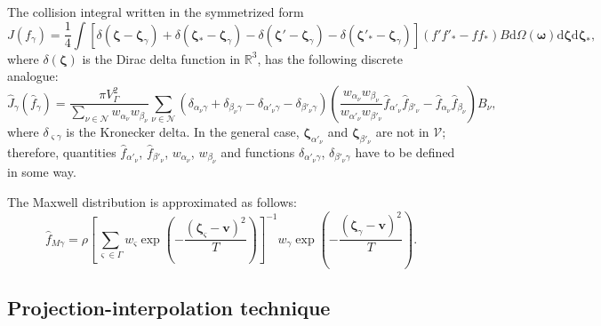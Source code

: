 \documentclass[10pt]{article}
\newcommand{\dd}{\mathrm{d}}
\newcommand{\dzeta}{\boldsymbol{\dd\zeta}}
\newcommand{\bzeta}{\boldsymbol{\zeta}}
\newcommand{\Nu}{\mathcal{N}}
\begin{document}
The collision integral written in the symmetrized form
\begin{equation}\label{eq:symm_ci}
    J(f_\gamma) = \frac14\int \left[
        \delta(\bzeta-\bzeta_\gamma) + \delta(\bzeta_*-\bzeta_\gamma)
        - \delta(\bzeta'-\bzeta_\gamma) - \delta(\bzeta'_*-\bzeta_\gamma)\right]
        (f'f'_* - ff_*)B \dd\Omega(\boldsymbol{\omega}) \dzeta\dzeta_*,
\end{equation}
where \(\delta(\bzeta)\) is the Dirac delta function in \(\mathbb{R}^3\),
has the following discrete analogue:
\begin{equation}\label{eq:discrete_symm_ci}
    \hat{J}_\gamma(\hat{f}_\gamma) =
        \frac{\pi V_\Gamma^2}{\sum_{\nu\in\Nu} w_{\alpha_\nu}w_{\beta_\nu}}
        \sum_{\nu\in\Nu} \left(
            \delta_{\alpha_\nu\gamma} + \delta_{\beta_\nu\gamma}
            - \delta_{\alpha'_\nu\gamma} - \delta_{\beta'_\nu\gamma}
        \right)\left(
            \frac{w_{\alpha_\nu}w_{\beta_\nu}}{w_{\alpha'_\nu}w_{\beta'_\nu}}
            \hat{f}_{\alpha'_\nu}\hat{f}_{\beta'_\nu} - \hat{f}_{\alpha_\nu}\hat{f}_{\beta_\nu}
        \right)B_\nu,
\end{equation}
where \(\delta_{\varsigma\gamma}\) is the Kronecker delta.
In the general case, \(\bzeta_{\alpha'_\nu}\) and \(\bzeta_{\beta'_\nu}\) are not in \(\mathcal{V}\);
therefore, quantities \(\hat{f}_{\alpha'_\nu}\), \(\hat{f}_{\beta'_\nu}\), \(w_{\alpha_\nu}\), \(w_{\beta_\nu}\)
and functions \(\delta_{\alpha'_\nu\gamma}\), \(\delta_{\beta'_\nu\gamma}\) have to be defined in some way.

The Maxwell distribution is approximated as follows:
\begin{equation}\label{eq:discrete_Maxwellian}
    \hat{f}_{M\gamma} = \rho\left[\sum_{\varsigma\in\Gamma}w_\varsigma\exp
            \left(-\frac{(\bzeta_\varsigma - \boldsymbol{v})^2}{T}\right)
        \right]^{-1}
        w_\gamma\exp\left(-\frac{(\bzeta_\gamma - \boldsymbol{v})^2}{T}\right).
\end{equation}

\subsection{Projection-interpolation technique}
\end{document}
